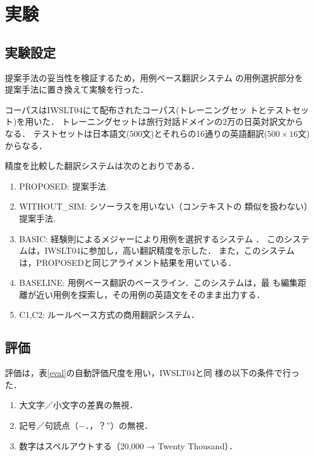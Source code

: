\section{実験}

\subsection{実験設定}


提案手法の妥当性を検証するため，用例ベース翻訳システム
\cite{Aramaki2004}の用例選択部分を提案手法に置き換えて実験を行った．

コーパスはIWSLT04\cite{WO_tsujii}にて配布されたコーパス(トレーニングセッ
トとテストセット)を用いた．
トレーニングセットは旅行対話ドメインの2万の日英対訳文からなる．
テストセットは日本語文($500$文)とそれらの16通りの英語翻訳($500 \times 16$文)からなる．

精度を比較した翻訳システムは次のとおりである．
\begin{enumerate}
\item {\sc PROPOSED:} 提案手法.
\item {\sc WITHOUT\_SIM:} シソーラスを用いない（コンテキストの
  類似を扱わない）提案手法.
\item {\sc BASIC:} 経験則によるメジャーにより用例を選択するシステム
  \cite{Aramaki2004}．
このシステムは，IWSLT04\cite{WO_tsujii}に参加し，高い翻訳精度を示した．
また，このシステムは，{\sc PROPOSED}と同じアライメント結果を用いている．
\item {\sc BASELINE:} 用例ベース翻訳のベースライン．このシステムは，最
  も編集距離が近い用例を探索し，その用例の英語文をそのまま出力する．
\item {\sc C1,C2:} ルールベース方式の商用翻訳システム．
\end{enumerate}

\subsection{評価}

評価は，表\ref{eval}の自動評価尺度を用い，IWSLT04\cite{WO_tsujii}と同
様の以下の条件で行った．

\begin{enumerate}
\item 大文字／小文字の差異の無視．
\item 記号／句読点（−．，？”）の無視．
\item 数字はスペルアウトする（20,000 → Twenty Thousand）．
\end{enumerate}

